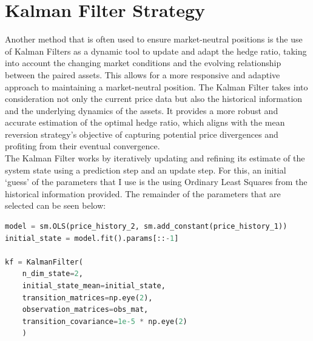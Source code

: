 \section{Kalman Filter Strategy}
Another method that is often used to ensure market-neutral positions is the use of Kalman Filters as a dynamic tool to update and adapt the hedge ratio, taking into account the changing market conditions and the evolving relationship between the paired assets. This allows for a more responsive and adaptive approach to maintaining a market-neutral position. The Kalman Filter takes into consideration not only the current price data but also the historical information and the underlying dynamics of the assets. It provides a more robust and accurate estimation of the optimal hedge ratio, which aligns with the mean reversion strategy's objective of capturing potential price divergences and profiting from their eventual convergence.
\\[3mm]
The Kalman Filter works by iteratively updating and refining its estimate of the system state using a prediction step and an update step. For this, an initial `guess' of the parameters that I use is the using Ordinary Least Squares from the historical information provided. The remainder of the parameters that are selected can be seen below:
\begin{lstlisting}[language=Python]
model = sm.OLS(price_history_2, sm.add_constant(price_history_1))
initial_state = model.fit().params[::-1]

kf = KalmanFilter(
    n_dim_state=2,
    initial_state_mean=initial_state,
    transition_matrices=np.eye(2),
    observation_matrices=obs_mat,
    transition_covariance=1e-5 * np.eye(2)
    )
\end{lstlisting}

